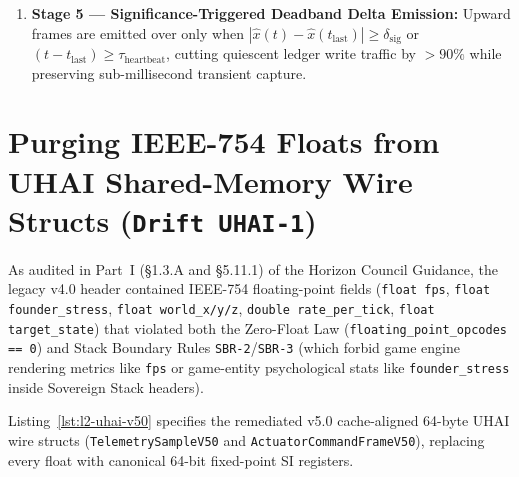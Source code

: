 \begin{enumerate}
    \begin{equation}
        \frac{1}{N_{\mathrm{eff}}} \sum_{m=0}^{N_{\mathrm{eff}}-1} \Bigl(10{,}000\cdot|\tilde{y}_{i,k-m}| - 7{,}979\cdot\sigma_i\Bigr) > \frac{18{,}083\cdot\sigma_i}{\sqrt{N_{\mathrm{eff}}}}.
        \label{eq:l2-folded-normal-integer}
    \end{equation}
    Breaching Equation~\eqref{eq:l2-folded-normal-integer} flags incipient hardware degradation (e.g., subterranean pipe leakage, PV string bypass-diode failure, or spindle bearing wear) weeks before mean process values cross an alarm limit.
    \item \textbf{Stage 5 --- Significance-Triggered Deadband Delta Emission:} Upward frames are emitted over  only when $|\hat{x}(t) - \hat{x}(t_{\mathrm{last}})| \ge \delta_{\mathrm{sig}}$ or $(t - t_{\mathrm{last}}) \ge \tau_{\mathrm{heartbeat}}$, cutting quiescent ledger write traffic by $> 90\%$ while preserving sub-millisecond transient capture.
\end{enumerate}

\section{Purging IEEE-754 Floats from UHAI Shared-Memory Wire Structs (\texttt{Drift UHAI-1})}
\label{sec:l2-uhai-zero-float-remediation}

As audited in Part~I (\S1.3.A and \S5.11.1) of the Horizon Council Guidance, the legacy v4.0 header  contained IEEE-754 floating-point fields (\texttt{float fps}, \texttt{float founder\_stress}, \texttt{float world\_x/y/z}, \texttt{double rate\_per\_tick}, \texttt{float target\_state}) that violated both the Zero-Float Law (\texttt{floating\_point\_opcodes == 0}) and Stack Boundary Rules \texttt{SBR-2}/\texttt{SBR-3} (which forbid game engine rendering metrics like \texttt{fps} or game-entity psychological stats like \texttt{founder\_stress} inside Sovereign Stack headers).

Listing~\ref{lst:l2-uhai-v50} specifies the remediated v5.0 cache-aligned 64-byte UHAI wire structs (\texttt{TelemetrySampleV50} and \texttt{ActuatorCommandFrameV50}), replacing every float with canonical 64-bit fixed-point SI registers.

